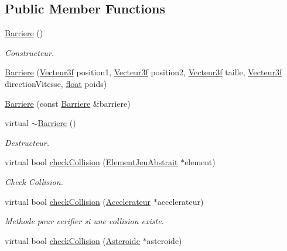 \subsection*{Public Member Functions}
\begin{DoxyCompactItemize}
\item 
\hyperlink{group__inf2990_gacf2b80faa55444228db735390db40fc7}{Barriere} ()
\begin{DoxyCompactList}\small\item\em Constructeur. \end{DoxyCompactList}\item 
\hyperlink{group__inf2990_ga17283625d17ad9370a60c00357b1bf3e}{Barriere} (\hyperlink{group__utilitaire_ga6b2956069f76c7e27df4f79f87e5a48c}{Vecteur3f} position1, \hyperlink{group__utilitaire_ga6b2956069f76c7e27df4f79f87e5a48c}{Vecteur3f} position2, \hyperlink{group__utilitaire_ga6b2956069f76c7e27df4f79f87e5a48c}{Vecteur3f} taille, \hyperlink{group__utilitaire_ga6b2956069f76c7e27df4f79f87e5a48c}{Vecteur3f} direction\-Vitesse, \hyperlink{fmod_8h_aeb841aa4b4b5f444b5d739d865b420af}{float} poids)
\item 
\hyperlink{group__inf2990_ga87db720230a9aced41fe2d33918f68d8}{Barriere} (const \hyperlink{class_barriere}{Barriere} \&barriere)
\item 
virtual \hyperlink{group__inf2990_ga99e534cc4cdddfce853a07d870270989}{$\sim$\-Barriere} ()
\begin{DoxyCompactList}\small\item\em Destructeur. \end{DoxyCompactList}\item 
virtual bool \hyperlink{group__inf2990_gad85230f246a469fb21f367df473049a3}{check\-Collision} (\hyperlink{class_element_jeu_abstrait}{Element\-Jeu\-Abstrait} $\ast$element)
\begin{DoxyCompactList}\small\item\em Check Collision. \end{DoxyCompactList}\item 
virtual bool \hyperlink{class_barriere_ad512ec476e54d29b8edd022a31573764}{check\-Collision} (\hyperlink{class_accelerateur}{Accelerateur} $\ast$accelerateur)
\begin{DoxyCompactList}\small\item\em Methode pour verifier si une collision existe. \end{DoxyCompactList}\item 
virtual bool \hyperlink{group__inf2990_ga046dcb0b3592e83e6ceecb848c138185}{check\-Collision} (\hyperlink{class_asteroide}{Asteroide} $\ast$asteroide)

\end{DoxyCompactItemize}
